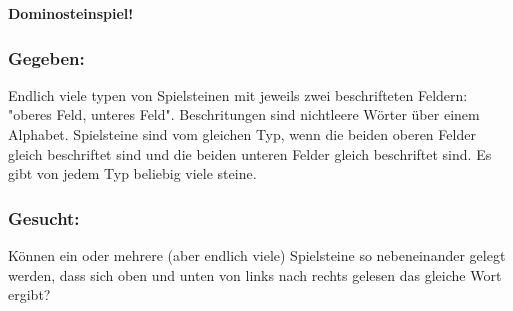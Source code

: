 \textbf{Dominosteinspiel!}
\subsubsection*{Gegeben: } Endlich viele typen von Spielsteinen mit jeweils zwei beschrifteten Feldern: "oberes Feld, unteres Feld". Beschritungen sind nichtleere Wörter über einem Alphabet. Spielsteine sind vom gleichen Typ, wenn die beiden oberen Felder gleich beschriftet sind und die beiden unteren Felder gleich beschriftet sind. Es gibt von jedem Typ beliebig viele steine. 

\subsubsection*{Gesucht: }Können ein oder mehrere (aber endlich viele) Spielsteine so nebeneinander gelegt werden, dass sich oben und unten von links nach rechts gelesen das gleiche Wort ergibt?


